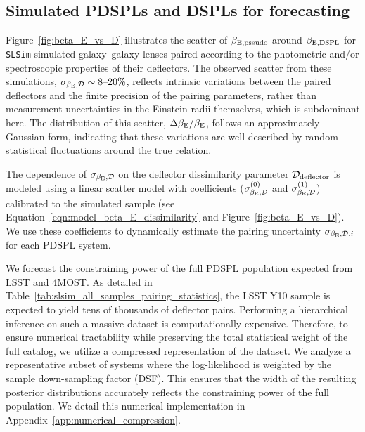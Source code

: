 \documentclass[a4paper,11pt]{article}
\begin{document}
\subsection{Simulated PDSPLs and DSPLs for forecasting}\label{sec:forecast_samples}

Figure~\ref{fig:beta_E_vs_D} illustrates the scatter of $\beta_{\rm E, pseudo}$ around $\beta_{\rm E, DSPL}$ for \texttt{SLSim} simulated galaxy–galaxy lenses paired according to the photometric and/or spectroscopic properties of their deflectors. The observed scatter from these simulations, $\sigma_{\beta_{\rm E}, \mathcal{D}} \sim 8\text{--}20\%$, reflects intrinsic variations between the paired deflectors and the finite precision of the pairing parameters, rather than measurement uncertainties in the Einstein radii themselves, which is subdominant here. The distribution of this scatter, $\Delta\beta_{\rm E}/\beta_{\rm E}$, follows an approximately Gaussian form, indicating that these variations are well described by random statistical fluctuations around the true relation.

The dependence of $\sigma_{\beta_{\rm E}, \mathcal{D}}$ on the deflector dissimilarity parameter $\mathcal{D}_{\rm deflector}$ is modeled using a linear scatter model with coefficients ($\sigma_{\beta_{\rm E},\rm \mathcal{D}}^{(0)}$ and $\sigma_{\beta_{\rm E},\rm \mathcal{D}}^{(1)}$) calibrated to the simulated sample (see Equation~\ref{eqn:model_beta_E_dissimilarity} and Figure~\ref{fig:beta_E_vs_D}). We use these coefficients to dynamically estimate the pairing uncertainty $\sigma_{\beta_{\rm E}, \mathcal{D}, i}$ for each PDSPL system.

We forecast the constraining power of the full PDSPL population expected from LSST and 4MOST. As detailed in Table~\ref{tab:slsim_all_samples_pairing_statistics}, the LSST Y10 sample is expected to yield tens of thousands of deflector pairs. Performing a hierarchical inference on such a massive dataset is computationally expensive. Therefore, to ensure numerical tractability while preserving the total statistical weight of the full catalog, we utilize a compressed representation of the dataset. We analyze a representative subset of systems where the log-likelihood is weighted by the sample down-sampling factor (DSF). This ensures that the width of the resulting posterior distributions accurately reflects the constraining power of the full population. We detail this numerical implementation in Appendix~\ref{app:numerical_compression}.
\end{document}
